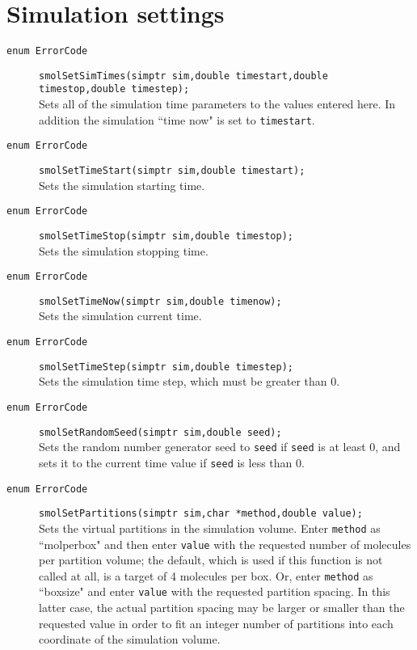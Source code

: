 \documentclass {book}
\begin{document}
\section{Simulation settings}

\begin{description}

\item[\texttt{enum ErrorCode}]
\texttt{smolSetSimTimes(simptr sim,double timestart,double timestop,double timestep);}
\hfill \\
Sets all of the simulation time parameters to the values entered here.  In addition the simulation ``time now" is set to \texttt{timestart}.

\item[\texttt{enum ErrorCode}]
\texttt{smolSetTimeStart(simptr sim,double timestart);}
\hfill \\
Sets the simulation starting time.

\item[\texttt{enum ErrorCode}]
\texttt{smolSetTimeStop(simptr sim,double timestop);}
\hfill \\
Sets the simulation stopping time.

\item[\texttt{enum ErrorCode}]
\texttt{smolSetTimeNow(simptr sim,double timenow);}
\hfill \\
Sets the simulation current time.

\item[\texttt{enum ErrorCode}]
\texttt{smolSetTimeStep(simptr sim,double timestep);}
\hfill \\
Sets the simulation time step, which must be greater than 0.

\item[\texttt{enum ErrorCode}]
\texttt{smolSetRandomSeed(simptr sim,double seed);}
\hfill \\
Sets the random number generator seed to \texttt{seed} if \texttt{seed} is at least 0, and sets it to the current time value if \texttt{seed} is less than 0.

\item[\texttt{enum ErrorCode}]
\texttt{smolSetPartitions(simptr sim,char *method,double value);}
\hfill \\
Sets the virtual partitions in the simulation volume.  Enter \texttt{method} as ``molperbox" and then enter \texttt{value} with the requested number of molecules per partition volume; the default, which is used if this function is not called at all, is a target of 4 molecules per box.  Or, enter \texttt{method} as ``boxsize" and enter \texttt{value} with the requested partition spacing.  In this latter case, the actual partition spacing may be larger or smaller than the requested value in order to fit an integer number of partitions into each coordinate of the simulation volume.

\end{description}
\end{document}
